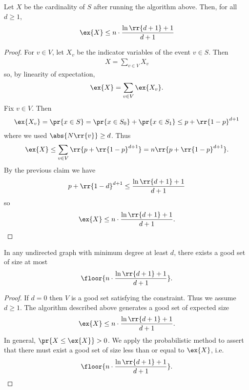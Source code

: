 \documentclass{article}
\begin{document}
\begin{claim*}
  Let $X$ be the cardinality of $S$ after running the algorithm above.
  Then, for all $d\geq 1$,
  \begin{align*}
    \ex{X}\leq n\cdot\frac{\ln\rr{d+1}+1}{d+1}
  \end{align*}
  \begin{proof}
    For $v\in V$,  let $X_v$ be the indicator variables of the event $v\in S$. Then
    \begin{align*}
      X=\sum_{v\in V} X_v
    \end{align*}
    so, by linearity of expectation,
    \begin{align*}
      \ex{X}=\sum_{v\in V} \ex{X_v}.
    \end{align*}
    Fix $v\in V$. Then
    \begin{align*}
      \ex{X_v}=\pr{x\in S}=\pr{x\in S_0} + \pr{x\in S_1} \leq p + \rr{1-p}^{d+1}
    \end{align*}
    where we used $\abs{N\rr{v}}\geq d$. Thus
    \begin{align*}
      \ex{X} \leq \sum_{v\in V} \rr{p+\rr{1-p}^{d+1}} = n\rr{p+\rr{1-p}^{d+1}}.
    \end{align*}
    By the previous claim we have
    \begin{align*}
      p+\rr{1-d}^{d+1}\leq \frac{\ln\rr{d+1}+1}{d+1}
    \end{align*}
    so
    \begin{align*}
      \ex{X}\leq n\cdot\frac{\ln\rr{d+1}+1}{d+1}.
    \end{align*}
  \end{proof}
\end{claim*}

\begin{claim*}
  In any undirected graph with minimum degree at least $d$, there exists
  a good set of size at most
  \begin{align*}
    \floor{n\cdot\frac{\ln\rr{d+1}+1}{d+1}}.
  \end{align*}
  \begin{proof}
    If $d=0$ then $V$ is a good set satisfying the constraint. Thus we assume $d\geq 1$.
    The algorithm described above generates a good set of expected size
    \begin{align*}
      \ex{X}\leq n\cdot \frac{\ln\rr{d+1}+1}{d+1}.
    \end{align*}
    In general, $\pr{X\leq \ex{X}} > 0$. We apply the probabilistic method to assert that
    there must exist a good set of size less than or equal to $\ex{X}$, i.e.
    \begin{align*}
      \floor{n\cdot\frac{\ln\rr{d+1}+1}{d+1}}.
    \end{align*}
  \end{proof}
\end{claim*}
\end{document}

